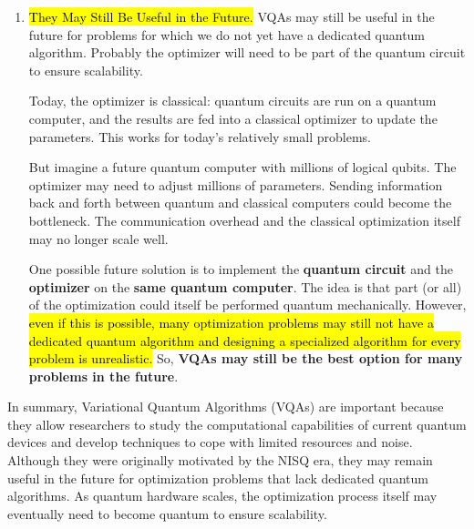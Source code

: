 \begin{enumerate}
    
    \item \hl{They May Still Be Useful in the Future.} VQAs may still be useful in the future for problems for which we do not yet have a dedicated quantum algorithm. Probably the optimizer will need to be part of the quantum circuit to ensure scalability.
    
    \highspace
    Today, the optimizer is classical: quantum circuits are run on a quantum computer, and the results are fed into a classical optimizer to update the parameters. This works for today's relatively small problems.

    \highspace
    But imagine a future quantum computer with millions of logical qubits. The optimizer may need to adjust millions of parameters. Sending information back and forth between quantum and classical computers could become the bottleneck. The communication overhead and the classical optimization itself may no longer scale well.

    \highspace
    One possible future solution is to implement the \textbf{quantum circuit} and the \textbf{optimizer} on the \textbf{same quantum computer}. The idea is that part (or all) of the optimization could itself be performed quantum mechanically. However, \hl{even if this is possible, many optimization problems may still not have a dedicated quantum algorithm and designing a specialized algorithm for every problem is unrealistic.} So, \textbf{VQAs may still be the best option for many problems in the future}.
\end{enumerate}
In summary, Variational Quantum Algorithms (VQAs) are important because they allow researchers to study the computational capabilities of current quantum devices and develop techniques to cope with limited resources and noise. Although they were originally motivated by the NISQ era, they may remain useful in the future for optimization problems that lack dedicated quantum algorithms. As quantum hardware scales, the optimization process itself may eventually need to become quantum to ensure scalability.